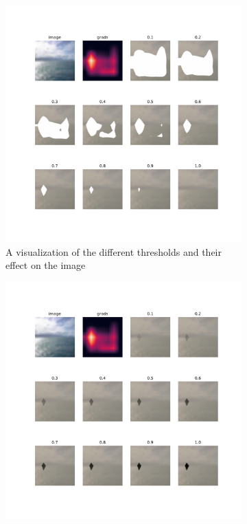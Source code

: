 \begin{figure}[!htb]
    \begin{subfigure}[b]{0.5\textwidth}
        \includegraphics[width=\linewidth, right]{images/grad_threshold.pdf}
        \caption{A visualization of the different thresholds and their effect on the image}
        \label{fig:thresholds}
    \end{subfigure}
    \begin{subfigure}[b]{0.5\textwidth}
        \includegraphics[width=\linewidth, left]{images/multiply_threshold.pdf}

\end{subfigure}
\end{figure}
